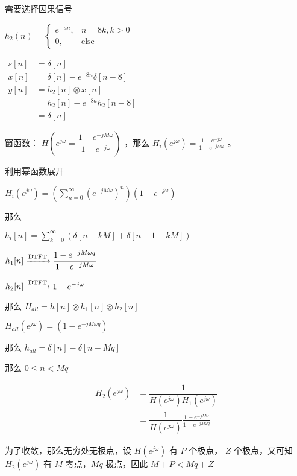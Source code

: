 \documentclass[lang=cn,11pt,a4paper,cite=authoryear,twocolumn]{elegantpaper}
\begin{document}

需要选择因果信号

\(h_2(n) = \left\{\begin{aligned}
    e^{-an},& n = 8 k, k > 0 \\
    0, & \text{else}
\end{aligned}\right.\)


\(\begin{aligned}
    s[n] &= \delta[n] \\
    x[n] &= \delta[n] - e^{-8n} \delta[n-8] \\
    y[n] &= h_2[n] \otimes x[n] \\ 
    &= h_2[n] - e^{-8a}h_2[n-8] \\
    &= \delta[n]
\end{aligned}\)



窗函数： \(H(e^{j\omega} = \dfrac{1-e^{-jM\omega}}{1-e^{-j\omega}})\) ，那么 \(H_i(e^{j\omega}) = \frac{1-e^{-j\omega}}{1-e^{-jM\omega}}\) 。

利用幂函数展开

\(H_i(e^{j\omega}) = (\sum_{n=0}^\infty (e^{-jM\omega})^n)(1-e^{-j\omega})\) 

那么 

\(h_i[n] = \sum_{k=0}^\infty (\delta[n-kM] + \delta[n-1-kM])\)


\(h_1[n] \xrightarrow{\text{DTFT}} \dfrac{1-e^{-jM\omega q}}{1-e^{-jM\omega}}\)

\(h_2[n] \xrightarrow{\text{DTFT}} 1 - e^{-j\omega}\)

那么 \(H_{all} = h[n] \otimes h_1[n] \otimes h_2[n]\) 

\(H_{all} (e^{j\omega}) = (1 - e^{-jM\omega q})\)

那么 \(h_{all} = \delta[n] - \delta[n-Mq]\) 

那么 \(0 \leq n < Mq\) 


\[\begin{aligned}
    H_2(e^{j\omega}) &= \dfrac{1}{H(e^{j\omega}) H_1(e^{j\omega})}\\
    &= \dfrac{1}{H(e^{j\omega})} \frac{1-e^{-jM\omega}}{1-e^{-jM\omega q}}
\end{aligned}\]

为了收敛，那么无穷处无极点，设 \(H(e^{j\omega})\) 有 \(P\) 个极点， \(Z\) 个极点，又可知 \(H_2(e^{j\omega})\) 有 \(M\) 零点，\(Mq\) 极点，因此 \(M + P < Mq + Z\)


\end{document}
